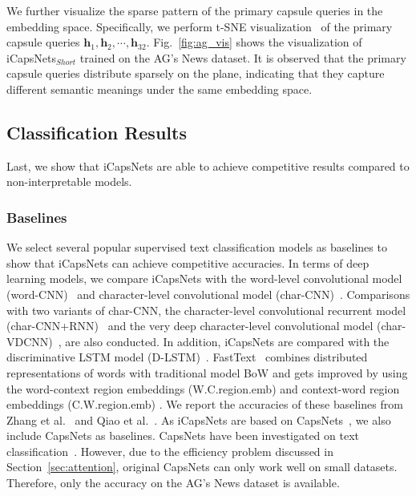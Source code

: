 \documentclass[10pt,journal,compsoc]{IEEEtran}
\begin{document}
We further visualize the sparse pattern of the primary capsule queries in the embedding space. Specifically, we perform t-SNE visualization~\cite{maaten2008visualizing} of the primary capsule queries $\mathbf{h}_1, \mathbf{h}_2, \cdots, \mathbf{h}_{32}$. Fig.~\ref{fig:ag_vis} shows the visualization of iCapsNets$_{Short}$ trained on the AG's News dataset. It is observed that the primary capsule queries distribute sparsely on the plane, indicating that they capture different semantic meanings under the same embedding space.

\subsection{Classification Results}

Last, we show that iCapsNets are able to achieve competitive results compared to non-interpretable models.

\subsubsection{Baselines}

We select several popular supervised text classification models as baselines to show that iCapsNets can achieve competitive accuracies. In terms of deep learning models, we compare iCapsNets with the word-level convolutional model (word-CNN)~\cite{kim2014convolutional} and character-level convolutional model (char-CNN)~\cite{zhang2015character}. Comparisons with two variants of char-CNN, the character-level convolutional recurrent model (char-CNN+RNN)~\cite{xiao2016efficient} and the very deep character-level convolutional model (char-VDCNN)~\cite{conneau2017very}, are also conducted. In addition, iCapsNets are compared with the discriminative LSTM model (D-LSTM)~\cite{yogatama2017generative}. FastText~\cite{joulin2017bag} combines distributed representations of words with traditional model BoW and gets improved by using the word-context region embeddings (W.C.region.emb) and context-word region embeddings (C.W.region.emb) \cite{qiao2018a}. We report the accuracies of these baselines from Zhang et al.~\cite{zhang2015character} and Qiao et al.~\cite{qiao2018a}. As iCapsNets are based on CapsNets~\cite{sabour2017dynamic}, we also include CapsNets as baselines. CapsNets have been investigated on text classification~\cite{yang2018investigating}. However, due to the efficiency problem discussed in Section~\ref{sec:attention}, original CapsNets can only work well on small datasets. Therefore, only the accuracy on the AG's News dataset is available.
\end{document}
